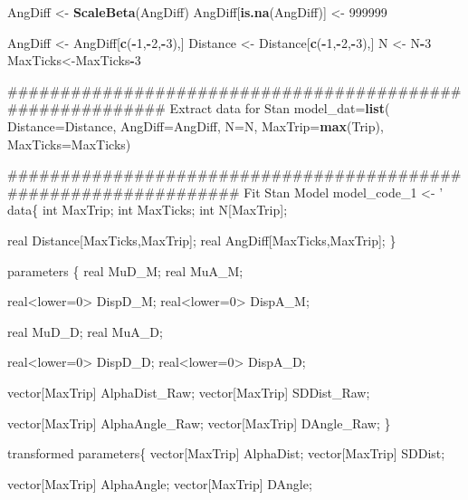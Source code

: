 \documentclass[]{article}
\newenvironment{Shaded}{\begin{snugshade}}{\end{snugshade}}
\newcommand{\KeywordTok}[1]{\textcolor[rgb]{0.13,0.29,0.53}{\textbf{#1}}}
\newcommand{\DataTypeTok}[1]{\textcolor[rgb]{0.13,0.29,0.53}{#1}}
\newcommand{\DecValTok}[1]{\textcolor[rgb]{0.00,0.00,0.81}{#1}}
\newcommand{\StringTok}[1]{\textcolor[rgb]{0.31,0.60,0.02}{#1}}
\newcommand{\OperatorTok}[1]{\textcolor[rgb]{0.81,0.36,0.00}{\textbf{#1}}}
\newcommand{\NormalTok}[1]{#1}
\begin{document}
\begin{Shaded}
\begin{Highlighting}[]
{\NormalTok{ AngDiff <-}\StringTok{ }\KeywordTok{ScaleBeta}\NormalTok{(AngDiff)}
\NormalTok{ AngDiff[}\KeywordTok{is.na}\NormalTok{(AngDiff)] <-}\StringTok{ }\DecValTok{999999}

\NormalTok{ AngDiff <-}\StringTok{ }\NormalTok{AngDiff[}\KeywordTok{c}\NormalTok{(}\OperatorTok{-}\DecValTok{1}\NormalTok{,}\OperatorTok{-}\DecValTok{2}\NormalTok{,}\OperatorTok{-}\DecValTok{3}\NormalTok{),]}
\NormalTok{ Distance <-}\StringTok{ }\NormalTok{Distance[}\KeywordTok{c}\NormalTok{(}\OperatorTok{-}\DecValTok{1}\NormalTok{,}\OperatorTok{-}\DecValTok{2}\NormalTok{,}\OperatorTok{-}\DecValTok{3}\NormalTok{),]}
\NormalTok{ N <-}\StringTok{ }\NormalTok{N}\OperatorTok{-}\DecValTok{3}
\NormalTok{ MaxTicks<-MaxTicks}\OperatorTok{-}\DecValTok{3}


\NormalTok{########################################################## Extract data for Stan    }
\NormalTok{model_dat=}\KeywordTok{list}\NormalTok{(}
\DataTypeTok{Distance=}\NormalTok{Distance, }
\DataTypeTok{AngDiff=}\NormalTok{AngDiff,}
\DataTypeTok{N=}\NormalTok{N,}
\DataTypeTok{MaxTrip=}\KeywordTok{max}\NormalTok{(Trip),}
\DataTypeTok{MaxTicks=}\NormalTok{MaxTicks)}

\NormalTok{################################################################# Fit Stan Model}
\NormalTok{model_code_}\DecValTok{1}\NormalTok{ <-}\StringTok{ '}
\StringTok{data\{}
\StringTok{int MaxTrip;}
\StringTok{int MaxTicks;}
\StringTok{int N[MaxTrip];}

\StringTok{real Distance[MaxTicks,MaxTrip];}
\StringTok{real AngDiff[MaxTicks,MaxTrip];}
\StringTok{\}}

\StringTok{parameters \{}
\StringTok{ real MuD_M;}
\StringTok{ real MuA_M;}

\StringTok{ real<lower=0> DispD_M;}
\StringTok{ real<lower=0> DispA_M;}

\StringTok{ real MuD_D;}
\StringTok{ real MuA_D;}

\StringTok{ real<lower=0> DispD_D;}
\StringTok{ real<lower=0> DispA_D;}

\StringTok{ vector[MaxTrip] AlphaDist_Raw;}
\StringTok{ vector[MaxTrip] SDDist_Raw; }

\StringTok{ vector[MaxTrip] AlphaAngle_Raw;}
\StringTok{ vector[MaxTrip] DAngle_Raw; }
\StringTok{\}}

\StringTok{transformed parameters\{}
\StringTok{ vector[MaxTrip] AlphaDist;}
\StringTok{ vector[MaxTrip] SDDist; }

\StringTok{ vector[MaxTrip] AlphaAngle;}
\StringTok{ vector[MaxTrip] DAngle; }

}
\end{Highlighting}
\end{Shaded}
\end{document}

